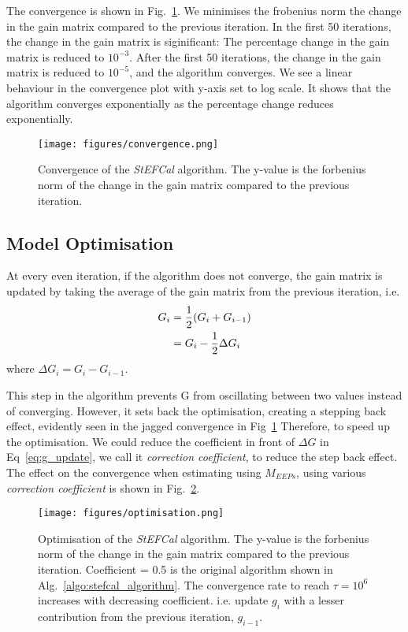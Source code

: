 \documentclass[10pt,a4paper,twocolumn]{article}
\begin{document}
The convergence is shown in Fig.~\ref{fig:convergence}. We minimises the frobenius norm the change in the gain matrix compared to the previous iteration.
In the first 50 iterations, the change in the gain matrix is siginificant: The percentage change in the gain matrix is reduced to $10^{-3}$. After the first 50 iterations, the change in the gain matrix is reduced to $10^{-5}$, and the algorithm converges. We see a linear behaviour in the convergence plot with y-axis set to log scale. It shows that the algorithm converges exponentially as the percentage change reduces exponentially.

\begin{figure}[H]
    \centering
    \texttt{[image: figures/convergence.png]}
    \caption{Convergence of the \textit{StEFCal} algorithm. The y-value is the forbenius norm of the change in the gain matrix compared to the previous iteration.}
    \label{fig:convergence}
\end{figure}

\subsection{Model Optimisation}
At every even iteration, if the algorithm does not converge, the gain matrix is updated by taking the average of the gain matrix from the previous iteration, i.e.
\begin{align}
    G_i &= \frac{1}{2} (G_i + G_{i-1}) \notag\\
    &= G_i - \frac{1}{2}\Delta G_i
    \label{eq:g_update}
\end{align}
where $\Delta G_i = G_i - G_{i-1}$. 

This step in the algorithm prevents G from oscillating between two values instead of converging. However, it sets back the optimisation, creating a stepping back effect, evidently seen in the jagged convergence in Fig~\ref{fig:convergence} Therefore, to speed up the optimisation. We could reduce the coefficient in front of $\Delta G$ in Eq~\ref{eq:g_update}, we call it \textit{correction coefficient}, to reduce the step back effect.
The effect on the convergence when estimating using $M_{EEPs}$, using various \textit{correction coefficient }is shown in Fig.~\ref{fig:optimisation}.

\begin{figure}[H]
    \centering
    \texttt{[image: figures/optimisation.png]}
    \caption{Optimisation of the \textit{StEFCal} algorithm. The y-value is the forbenius norm of the change in the gain matrix compared to the previous iteration. Coefficient = 0.5 is the original algorithm shown in Alg.~\ref{algo:stefcal_algorithm}. The convergence rate to reach $\tau = 10^6$ increases with decreasing coefficient. i.e. update $g_i$ with a lesser contribution from the previous iteration, $g_{i-1}$.}
    \label{fig:optimisation}
\end{figure}
\end{document}
